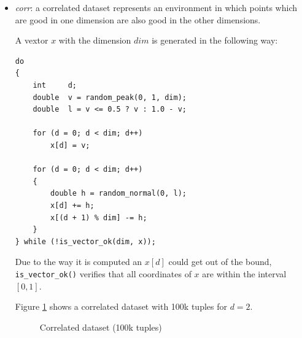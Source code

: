 \begin{itemize}
\item \emph{corr}: 
a correlated dataset represents an environment in which points which
are good in one dimension are also good in the other dimensions. 


A vextor $x$ with the dimension $dim$ is generated in the following way:

\begin{lstlisting}
do
{
	int		d;
	double	v = random_peak(0, 1, dim);
	double	l = v <= 0.5 ? v : 1.0 - v;
	
	for (d = 0; d < dim; d++)
		x[d] = v;

	for (d = 0; d < dim; d++)
	{
		double h = random_normal(0, l);
		x[d] += h;
		x[(d + 1) % dim] -= h;
	}
} while (!is_vector_ok(dim, x));
\end{lstlisting}

Due to the way it is computed an $x[d]$ could get out of the bound,
\lstinline{is_vector_ok()} verifies that all coordinates of $x$ are
within the interval $[0,1]$.

Figure \ref{fig:density-2d-c2d1e5} shows a correlated dataset with
100k tuples for $d = 2$.

\begin{figure}[htbp]
\centering
{}
\caption{Correlated dataset (100k tuples)}
\label{fig:density-2d-c2d1e5}
\end{figure}



\end{itemize}
